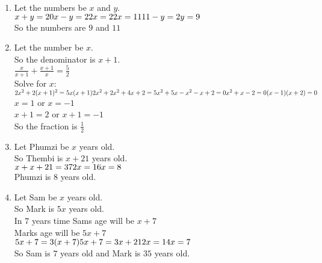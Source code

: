 \begin{solutions}{}
{\begin{enumerate}[itemsep=10pt, label=\textbf{\arabic*}. ]
\item Let the numbers be $x$ and $y$.\\
$x+y=20\\
x-y=2\\
2x=22\\
x=11\\
11-y=2\\
y=9$\\
So the numbers are $9$ and $11$
\item Let the number be $x$.\\
So the denominator is $x+1$.\\
$\frac{x}{x+1}+\frac{x+1}{x}=\frac{5}{2}$\\
Solve for $x$:\\
$2x^2+2(x+1)^2=5x(x+1)\\
2x^2+2x^2+4x+2=5x^2+5x\\
-x^2-x+2=0\\
x^2+x-2=0\\
(x-1)(x+2)=0$\\
$x=1$ or $x=-1$\\
$x+1=2$ or $x+1=-1$\\
So the fraction is $\frac{1}{2}$ 
\item Let Phumzi be $x$ years old.\\
So Thembi is $x+21$ years old.\\
$x+x+21=37\\
2x=16\\
x=8$\\
Phumzi is $8$ years old.
\item Let Sam be $x$ years old.\\
So Mark is $5x$ years old.\\
In $7$ years time Sams age will be $x+7$\\
Marks age will be $5x+7$\\
$5x+7=3(x+7)\\
5x+7=3x+21\\
2x=14\\
x=7$\\
So Sam is $7$ years old and Mark is $35$ years old.
\end{enumerate}}
\end{solutions}


